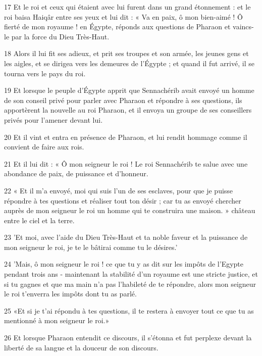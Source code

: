 \par 17 Et le roi et ceux qui étaient avec lui furent dans un grand étonnement : et le roi baisa Haiqâr entre ses yeux et lui dit : « Va en paix, ô mon bien-aimé ! Ô fierté de mon royaume ! en Égypte, réponds aux questions de Pharaon et vaincs-le par la force du Dieu Très-Haut.

\par 18 Alors il lui fit ses adieux, et prit ses troupes et son armée, les jeunes gens et les aigles, et se dirigea vers les demeures de l'Égypte ; et quand il fut arrivé, il se tourna vers le pays du roi.

\par 19 Et lorsque le peuple d'Égypte apprit que Sennachérib avait envoyé un homme de son conseil privé pour parler avec Pharaon et répondre à ses questions, ils apportèrent la nouvelle au roi Pharaon, et il envoya un groupe de ses conseillers privés pour l'amener devant lui.

\par 20 Et il vint et entra en présence de Pharaon, et lui rendit hommage comme il convient de faire aux rois.

\par 21 Et il lui dit : « Ô mon seigneur le roi ! Le roi Sennachérib te salue avec une abondance de paix, de puissance et d'honneur.

\par 22 « Et il m'a envoyé, moi qui suis l'un de ses esclaves, pour que je puisse répondre à tes questions et réaliser tout ton désir ; car tu as envoyé chercher auprès de mon seigneur le roi un homme qui te construira une maison. » château entre le ciel et la terre.

\par 23 'Et moi, avec l'aide du Dieu Très-Haut et ta noble faveur et la puissance de mon seigneur le roi, je te le bâtirai comme tu le désires.'

\par 24 'Mais, ô mon seigneur le roi ! ce que tu y as dit sur les impôts de l'Egypte pendant trois ans - maintenant la stabilité d'un royaume est une stricte justice, et si tu gagnes et que ma main n'a pas l'habileté de te répondre, alors mon seigneur le roi t'enverra les impôts dont tu as parlé.

\par 25 «Et si je t'ai répondu à tes questions, il te restera à envoyer tout ce que tu as mentionné à mon seigneur le roi.»

\par 26 Et lorsque Pharaon entendit ce discours, il s'étonna et fut perplexe devant la liberté de sa langue et la douceur de son discours.


